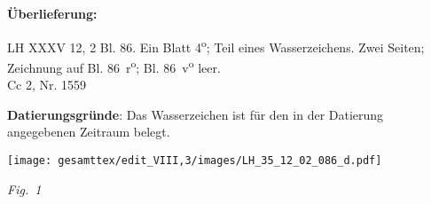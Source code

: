 \begin{ledgroupsized}[r]{120mm}
\footnotesize
\pstart
\noindent\textbf{\"{U}berlieferung:}
\pend
\end{ledgroupsized}
\begin{ledgroupsized}[r]{114mm}
\footnotesize
\pstart \parindent -6mm
%
LH XXXV 12, 2 Bl. 86. Ein Blatt 4\textsuperscript{o}; Teil eines Wasserzeichens. Zwei Seiten; Zeichnung auf Bl. 86~r\textsuperscript{o}; Bl. 86~v\textsuperscript{o} leer.
\\ Cc 2, Nr. 1559
\pend
\end{ledgroupsized}
\vspace{5mm}
\begin{ledgroup}
\footnotesize
\pstart
\noindent\footnotesize{\textbf{Datierungsgr\"{u}nde}: Das Wasserzeichen ist für den in der Datierung angegebenen Zeitraum belegt.}
\pend
\end{ledgroup}

\vspace{5mm}
\pstart\noindent
[86~r\textsuperscript{o}] 
\vspace{0.5em}
\pend
\centerline{\texttt{[image: gesamttex/edit\_VIII,3/images/LH\_35\_12\_02\_086\_d.pdf]}}
\centerline{\lbrack\textit{Fig.~1}\rbrack}
\count{}%
\count{}%
\count{}